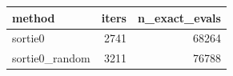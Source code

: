 \begin{tabular}{lrr}
\toprule
method & iters & n_exact_evals \\
\midrule
sortie0 & 2741 & 68264 \\
sortie0_random & 3211 & 76788 \\
\bottomrule
\end{tabular}
